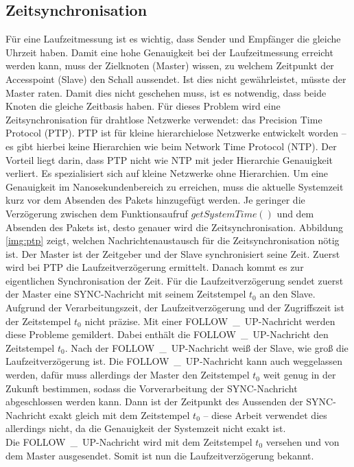 \subsection{Zeitsynchronisation}
Für eine Laufzeitmessung ist es wichtig, dass Sender und Empfänger die gleiche Uhrzeit haben. Damit eine hohe Genauigkeit bei der Laufzeitmessung erreicht werden kann, muss der Zielknoten (Master) wissen, zu welchem Zeitpunkt der Accesspoint (Slave) den Schall aussendet. Ist dies nicht gewährleistet, müsste der Master raten. Damit dies nicht geschehen muss, ist es notwendig, dass beide Knoten die gleiche Zeitbasis haben. Für dieses Problem wird eine Zeitsynchronisation für drahtlose Netzwerke verwendet: das Precision Time Protocol (PTP). PTP ist für kleine hierarchielose Netzwerke entwickelt worden -- es gibt hierbei keine Hierarchien wie beim Network Time Protocol (NTP). Der Vorteil liegt darin, dass PTP nicht wie NTP mit jeder Hierarchie Genauigkeit verliert. Es spezialisiert sich auf kleine Netzwerke ohne Hierarchien. Um eine Genauigkeit im Nanosekundenbereich zu erreichen, muss die aktuelle Systemzeit kurz vor dem Absenden des Pakets hinzugefügt werden. Je geringer die Verzögerung zwischen dem Funktionsaufruf $getSystemTime()$ und dem Absenden des Pakets ist, desto genauer wird die Zeitsynchronisation. Abbildung \ref{img:ptp} zeigt, welchen Nachrichtenaustausch für die Zeitsynchronisation nötig ist. Der Master ist der Zeitgeber und der Slave synchronisiert seine Zeit. 
Zuerst wird bei PTP die Laufzeitverzögerung ermittelt. Danach kommt es zur eigentlichen Synchronisation der Zeit. Für die Laufzeitverzögerung sendet zuerst der Master eine \si{SYNC}-Nachricht mit seinem Zeitstempel $t_{0}$ an den Slave. Aufgrund der Verarbeitungszeit, der Laufzeitverzögerung und der Zugriffszeit ist der Zeitstempel $t_{0}$ nicht präzise. Mit einer \si{FOLLOW\_UP}-Nachricht werden diese Probleme gemildert. Dabei enthält die \si{FOLLOW\_UP}-Nachricht den Zeitstempel $t_{0}$. Nach der \si{FOLLOW\_UP}-Nachricht weiß der Slave, wie groß die Laufzeitverzögerung ist. Die \si{FOLLOW\_UP}-Nachricht kann auch weggelassen werden, dafür muss allerdings der Master den Zeitstempel $t_{0}$ weit genug in der Zukunft bestimmen, sodass die Vorverarbeitung der \si{SYNC}-Nachricht abgeschlossen werden kann. Dann ist der Zeitpunkt des Aussenden der \si{SYNC}-Nachricht exakt gleich mit dem Zeitstempel $t_{0}$ -- diese Arbeit verwendet dies allerdings nicht, da die Genauigkeit der Systemzeit nicht exakt ist.
\\
Die \si{FOLLOW\_UP}-Nachricht wird mit dem Zeitstempel $t_{0}$ versehen und von dem Master ausgesendet. Somit ist nun die Laufzeitverzögerung bekannt.
